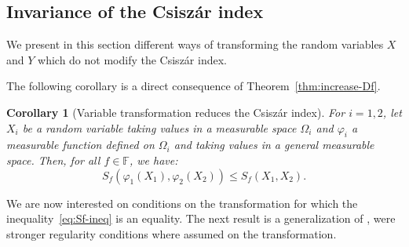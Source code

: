 \documentclass[12pt]{article}
\newcommand{\F}{{\mathbb F}}
\theoremstyle{plain}
\newtheorem{cor}[theo]{Corollary}
\theoremstyle{remark}
\begin{document}
\subsection{Invariance of the Csisz\'ar index}

We present  in this  section different ways  of transforming  the random
variables $X$ and $Y$ which do not modify the Csisz\'ar index. 

The following corollary  is a direct consequence of
Theorem~\ref{thm:increase-Df}. 

\begin{cor}[Variable transformation reduces the Csisz\'ar index]
    \label{cor:increase_Sf}
  For $i=1, 2$, let  $X_i $  be a random variable taking values in a
  measurable space $\Omega_i $ and
$\varphi_i$ a measurable function defined on $\Omega_i$ and taking
values in a general measurable space. Then, for all $f \in \F$, we have:
\begin{equation}
   \label{eq:Sf-ineq}
   S_f(\varphi_1(X_1), \varphi_2(X_2)) \leq   S_f(X_1,X_2) .
\end{equation}    
 \end{cor}

 We are now interested on conditions on the transformation for which
 the inequality~\eqref{eq:Sf-ineq} is an equality. 
The next result is a generalization of
\citet[Proposition~3.6]{rahman2016f}, were stronger regularity conditions where
assumed on the transformation.%
\end{document}
